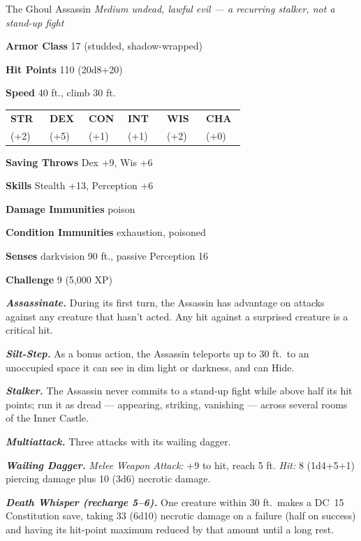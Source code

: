 \documentclass[10pt,twoside]{report}
\makeatletter
\newcommand{\msub}[1]{{\itshape #1}\par}
\newcommand{\mrule}{\par\vspace{2pt}{\color{gukred}\rule{\linewidth}{1.1pt}}\par\vspace{2pt}}
\newcommand{\mthin}{\par\vspace{1pt}{\color{gukred!60}\rule{\linewidth}{0.5pt}}\par\vspace{2pt}}
\newcommand{\mfield}[2]{\noindent\textbf{\color{gukred}#1} #2\par}
\newcommand{\mhead}[1]{\par\smallskip{\sffamily\bfseries\scshape\color{gukred}#1}\par
  \vspace{-3pt}{\color{gukred}\rule{\linewidth}{0.7pt}}\par\vspace{2pt}}
\newcommand{\mtrait}[2]{\noindent\textbf{\itshape #1} #2\par\vspace{2pt}}
\newcommand{\abilities}[6]{\par\smallskip\noindent
  {\setlength{\tabcolsep}{1.5pt}%
  \begin{tabular}{@{}*{6}{p{0.15\linewidth}}@{}}
  \centering\sffamily\bfseries\color{gukred}STR &\centering\sffamily\bfseries\color{gukred}DEX
  &\centering\sffamily\bfseries\color{gukred}CON &\centering\sffamily\bfseries\color{gukred}INT
  &\centering\sffamily\bfseries\color{gukred}WIS &\centering\arraybackslash\sffamily\bfseries\color{gukred}CHA\\
  \centering #1 &\centering #2 &\centering #3 &\centering #4 &\centering #5 &\centering\arraybackslash #6\\
  \end{tabular}}\par\smallskip}
\newcommand{\dc}[1]{DC~#1}
\makeatother
\begin{document}
\begin{statblock}{The Ghoul Assassin}
\msub{Medium undead, lawful evil --- \textnormal{a recurring stalker, not a stand-up fight}}
\mrule
\mfield{Armor Class}{17 (studded, shadow-wrapped)}
\mfield{Hit Points}{110 (20d8+20)}
\mfield{Speed}{40 ft., climb 30 ft.}
\abilities{14 (+2)}{20 (+5)}{13 (+1)}{13 (+1)}{15 (+2)}{10 (+0)}
\mthin
\mfield{Saving Throws}{Dex +9, Wis +6}
\mfield{Skills}{Stealth +13, Perception +6}
\mfield{Damage Immunities}{poison}
\mfield{Condition Immunities}{exhaustion, poisoned}
\mfield{Senses}{darkvision 90 ft., passive Perception 16}
\mfield{Challenge}{9 (5{,}000 XP)}
\mrule
\mtrait{Assassinate.}{During its first turn, the Assassin has advantage on attacks against any creature that hasn't acted. Any hit against a surprised creature is a critical hit.}
\mtrait{Silt-Step.}{As a bonus action, the Assassin teleports up to 30 ft.\ to an unoccupied space it can see in dim light or darkness, and can Hide.}
\mtrait{Stalker.}{The Assassin never commits to a stand-up fight while above half its hit points; run it as dread --- appearing, striking, vanishing --- across several rooms of the Inner Castle.}
\mhead{Actions}
\mtrait{Multiattack.}{Three attacks with its wailing dagger.}
\mtrait{Wailing Dagger.}{\textit{Melee Weapon Attack:} +9 to hit, reach 5 ft. \textit{Hit:} 8 (1d4+5+1) piercing damage plus 10 (3d6) necrotic damage.}
\mtrait{Death Whisper (recharge 5--6).}{One creature within 30 ft.\ makes a \dc{15} Constitution save, taking 33 (6d10) necrotic damage on a failure (half on success) and having its hit-point maximum reduced by that amount until a long rest.}
\end{statblock}
\end{document}
